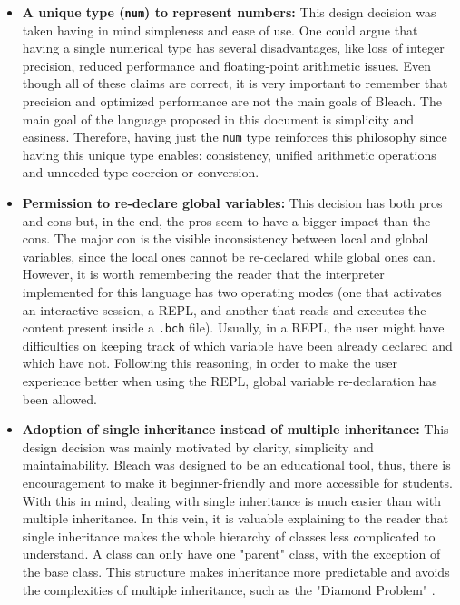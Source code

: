 \begin{itemize}
\begin{itemize}
        \item \textbf{A unique type (\texttt{num}) to represent numbers:} This design decision was taken having in mind simpleness and ease of use. One could argue that having a single numerical type has several disadvantages, like loss of integer precision, reduced performance and floating-point arithmetic issues. Even though all of these claims are correct, it is very important to remember that precision and optimized performance are not the main goals of Bleach. The main goal of the language proposed in this document is simplicity and easiness. Therefore, having just the \texttt{num} type reinforces this philosophy since having this unique type enables: consistency, unified arithmetic operations and unneeded type coercion or conversion.
        
        \item \textbf{Permission to re-declare global variables:} This decision has both pros and cons but, in the end, the pros seem to have a bigger impact than the cons. The major con is the visible inconsistency between local and global variables, since the local ones cannot be re-declared while global ones can. However, it is worth remembering the reader that the interpreter implemented for this language has two operating modes (one that activates an interactive session, a REPL, and another that reads and executes the content present inside a \texttt{.bch} file). Usually, in a REPL, the user might have difficulties on keeping track of which variable have been already declared and which have not. Following this reasoning, in order to make the user experience better when using the REPL, global variable re-declaration has been allowed.
        
        \item \textbf{Adoption of single inheritance instead of multiple inheritance:} This design decision was mainly motivated by clarity, simplicity and maintainability. Bleach was designed to be an educational tool, thus, there is encouragement to make it beginner-friendly and more accessible for students. With this in mind, dealing with single inheritance is much easier than with multiple inheritance. In this vein, it is valuable explaining to the reader that single inheritance makes the whole hierarchy of classes less complicated to understand. A class can only have one "parent" class, with the exception of the base class. This structure makes inheritance more predictable and avoids the complexities of multiple inheritance, such as the "Diamond Problem" \cite{wikipedia_the_diamond_problem}.
    \end{itemize}



\end{itemize}

